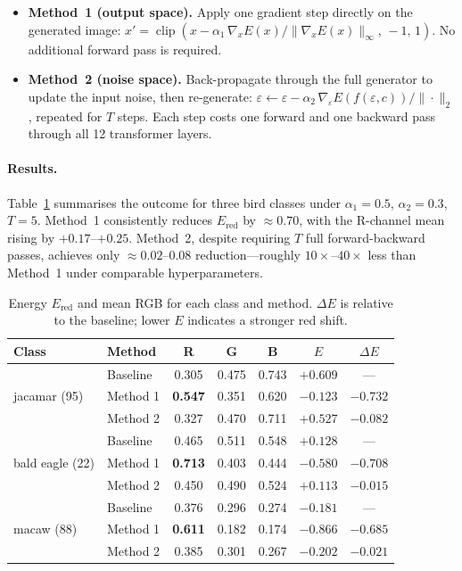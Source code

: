 \documentclass[12pt]{article}
\begin{document}
\begin{itemize}
  \item \textbf{Method~1 (output space).}
    Apply one gradient step directly on the generated image:
    $x' = \operatorname{clip}(x - \alpha_1 \,\nabla_x E(x) / \|\nabla_x E(x)\|_\infty,\,-1,\,1)$.
    No additional forward pass is required.

  \item \textbf{Method~2 (noise space).}
    Back-propagate through the full generator to update the input noise,
    then re-generate: $\varepsilon \leftarrow \varepsilon - \alpha_2\,
    \nabla_\varepsilon E(f(\varepsilon,c))/\|\cdot\|_2$, repeated for $T$ steps.
    Each step costs one forward and one backward pass through all 12
    transformer layers.
\end{itemize}

\paragraph{Results.}
Table~\ref{tab:red} summarises the outcome for three bird classes
under $\alpha_1{=}0.5$, $\alpha_2{=}0.3$, $T{=}5$.
Method~1 consistently reduces $E_{\mathrm{red}}$ by $\approx 0.70$, with
the R-channel mean rising by $+0.17$--$+0.25$.
Method~2, despite requiring $T$ full forward-backward passes,
achieves only $\approx 0.02$--$0.08$ reduction---roughly $10\times$--$40\times$
less than Method~1 under comparable hyperparameters.

\begin{table}[h]
  \centering
  \caption{Energy $E_{\mathrm{red}}$ and mean RGB for each class and method.
    $\Delta E$ is relative to the baseline; lower $E$ indicates a stronger red shift.}
  \label{tab:red}
  \small
  \begin{tabular}{llccccc}
    \toprule
    Class & Method & R & G & B & $E$ & $\Delta E$ \\
    \midrule
    \multirow{3}{*}{jacamar (95)}
      & Baseline     & 0.305 & 0.475 & 0.743 & $+0.609$ & ---  \\
      & Method 1     & \textbf{0.547} & 0.351 & 0.620 & $-0.123$ & $-0.732$ \\
      & Method 2     & 0.327 & 0.470 & 0.711 & $+0.527$ & $-0.082$ \\
    \midrule
    \multirow{3}{*}{bald eagle (22)}
      & Baseline     & 0.465 & 0.511 & 0.548 & $+0.128$ & ---  \\
      & Method 1     & \textbf{0.713} & 0.403 & 0.444 & $-0.580$ & $-0.708$ \\
      & Method 2     & 0.450 & 0.490 & 0.524 & $+0.113$ & $-0.015$ \\
    \midrule
    \multirow{3}{*}{macaw (88)}
      & Baseline     & 0.376 & 0.296 & 0.274 & $-0.181$ & ---  \\
      & Method 1     & \textbf{0.611} & 0.182 & 0.174 & $-0.866$ & $-0.685$ \\
      & Method 2     & 0.385 & 0.301 & 0.267 & $-0.202$ & $-0.021$ \\
    \bottomrule
  \end{tabular}
\end{table}
\end{document}
